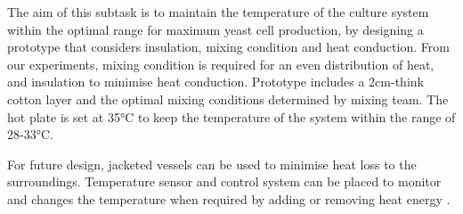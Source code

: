 The aim of this subtask is to maintain the temperature of the culture system within the optimal range for maximum yeast cell production, by designing a prototype that considers insulation, mixing condition and heat conduction. From our experiments, mixing condition is required for an even distribution of heat, and insulation to minimise heat conduction. Prototype includes a 2cm-think cotton layer and the optimal mixing conditions determined by mixing team. The hot plate is set at 35\si{\celsius} to keep the temperature of the system within the range of 28-33\si{\celsius}. 

For future design, jacketed vessels \cite{VerisovaMarcela2015Htia} can be used to minimise heat loss to the surroundings. Temperature sensor and control system can be placed to monitor and changes the temperature when required by adding or removing heat energy \cite{DellamorteJosephC2007Hrsw}.